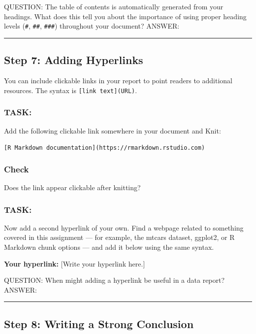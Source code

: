 \documentclass[
]{article}
\begin{document}
QUESTION: The table of contents is automatically generated from your
headings. What does this tell you about the importance of using proper
heading levels (\texttt{\#}, \texttt{\#\#}, \texttt{\#\#\#}) throughout
your document? ANSWER:

\begin{center}\rule{0.5\linewidth}{0.5pt}\end{center}

\subsection{Step 7: Adding Hyperlinks}\label{step-7-adding-hyperlinks}

You can include clickable links in your report to point readers to
additional resources. The syntax is \texttt{{[}link\ text{]}(URL)}.

\subsubsection{TASK:}\label{task-16}

Add the following clickable link somewhere in your document and Knit:

\texttt{{[}R\ Markdown\ documentation{]}(https://rmarkdown.rstudio.com)}

\subsubsection{Check}\label{check-7}

Does the link appear clickable after knitting?

\subsubsection{TASK:}\label{task-17}

Now add a second hyperlink of your own. Find a webpage related to
something covered in this assignment --- for example, the mtcars
dataset, ggplot2, or R Markdown chunk options --- and add it below using
the same syntax.

\textbf{Your hyperlink:} {[}Write your hyperlink here.{]}

QUESTION: When might adding a hyperlink be useful in a data report?
ANSWER:

\begin{center}\rule{0.5\linewidth}{0.5pt}\end{center}

\subsection{Step 8: Writing a Strong
Conclusion}\label{step-8-writing-a-strong-conclusion}
\end{document}
